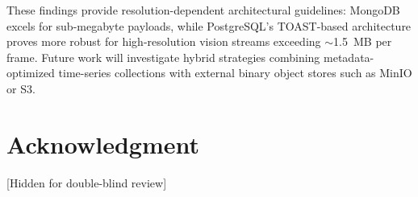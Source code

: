 \documentclass[conference, a4paper]{IEEEtran}
\begin{document}
These findings provide resolution-dependent architectural guidelines: MongoDB excels for sub-megabyte payloads, while PostgreSQL's TOAST-based architecture proves more robust for high-resolution vision streams exceeding $\sim$1.5~MB per frame. Future work will investigate hybrid strategies combining metadata-optimized time-series collections with external binary object stores such as MinIO or S3.


\section*{Acknowledgment}
[Hidden for double-blind review]




\end{document}
